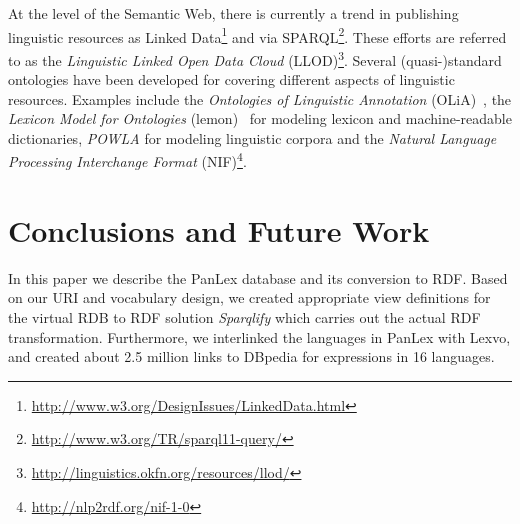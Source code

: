 \documentclass[sw]{iosart2c}
\begin{document}

At the level of the Semantic Web, there is currently a trend in publishing linguistic resources
as Linked Data\footnote{\url{http://www.w3.org/DesignIssues/LinkedData.html}} and via SPARQL{\footnote{\url{http://www.w3.org/TR/sparql11-query/}}}.
These efforts are referred to as the \emph{Linguistic Linked Open Data Cloud} (LLOD)\footnote{\url{http://linguistics.okfn.org/resources/llod/}}. 
Several (quasi-)standard ontologies have been developed for covering different aspects of linguistic resources.
Examples include the \emph{Ontologies of Linguistic Annotation} (OLiA)~\cite{olia2010},
the \emph{Lexicon Model for Ontologies} (lemon)~\cite{lemon2011} for modeling lexicon and machine-readable dictionaries,
\emph{POWLA} for modeling linguistic corpora\cite{powla2012}
and the \emph{Natural Language Processing Interchange Format} (NIF)\footnote{\url{http://nlp2rdf.org/nif-1-0}}.







\section{Conclusions and Future Work}
\label{sec:conclusion}
In this paper we describe the PanLex database and its conversion to RDF.
Based on our URI and vocabulary design, we created appropriate view definitions
for the virtual RDB to RDF solution \emph{Sparqlify} which carries out
the actual RDF transformation.
Furthermore, we interlinked the languages in PanLex with Lexvo,
and created about 2.5 million links to DBpedia for expressions in 16 languages.
\end{document}
